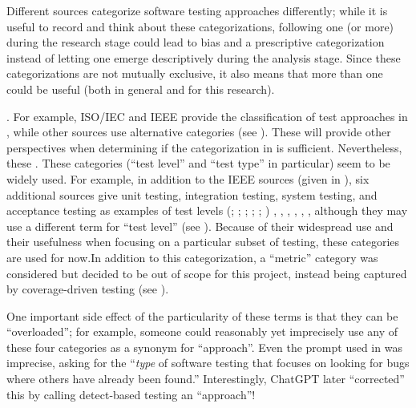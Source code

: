Different sources categorize software testing approaches differently\ifnotpaper;
while it is useful to record and think about these categorizations, following
one (or more) during the research
stage could lead to bias and a prescriptive categorization instead of letting
one emerge descriptively during the analysis stage. Since these categorizations
are not mutually exclusive, it also means that more than one could be useful
(both in general and for this research).\par \citet{IEEE2022} \else. For
example, ISO/IEC and IEEE \cite{IEEE2022} \fi provide the classification of test
approaches in \ifnotpaper, while other sources
\citep{BarbosaEtAl2006, SouzaEtAl2017} use alternative categories (see
). These will provide other perspectives when
determining if the categorization in  is sufficient.
Nevertheless, these \else. These \fi categories (``test level'' and ``test
type'' in particular) seem to be widely used. For example, in addition to the
IEEE sources (given in ), six additional sources give
unit testing, integration testing, system testing, and acceptance testing as
examples of test levels \ifnotpaper
    (\citealp[pp.~5-6 to 5-7]{SWEBOK2024}; \citealpISTQB{};
    \citealp[p.~218]{KuļešovsEtAl2013};
    \citealp[p.~807-808]{Perry2006}; \citealp[pp.~443-445]{PetersAndPedrycz2000};
    \citealp[pp.~9,~13]{Gerrard2000a})\else
    \cite{ISTQB}, \cite[pp.~5-6 to 5-7]{SWEBOK2024},
    \cite[pp.~9,~13]{Gerrard2000a}, \cite[p.~807-808]{Perry2006},
    \cite[pp.~443-445]{PetersAndPedrycz2000}, \citealp[p.~218]{KuļešovsEtAl2013}%
    \fi, although they may use a different term for ``test
level'' (see ). Because of their widespread use and
their usefulness when focusing on a particular subset of testing, these
categories are used for now.\ifnotpaper In addition to this categorization, a
    ``metric'' category was considered but decided to be
    out of scope for this project, instead being captured by coverage-driven
    testing (see ). \fi

One important side effect of the particularity of
these terms is that they can be ``overloaded''; for example, someone could
reasonably yet imprecisely use any of these four categories as a synonym for
``approach''. Even the prompt used in \citep[emphasis added]{ChatGPT2024} was
imprecise, asking for the ``\emph{type} of software testing that focuses on
looking for bugs where others have already been found.'' Interestingly, ChatGPT
later ``corrected'' this by calling detect-based testing an ``approach''!

